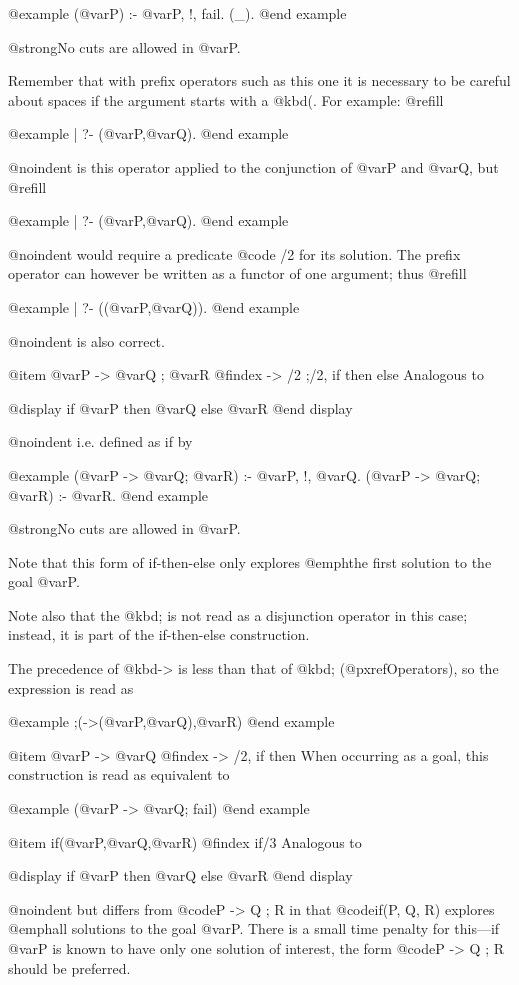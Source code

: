 @example
\+(@var{P}) :- @var{P}, !, fail.
\+(_).
@end example

@strong{No cuts are allowed in @var{P}.}

Remember that with prefix operators such as this one it is necessary to be
careful about spaces if the argument starts with a @kbd{(}.  For
example: @refill

@example
| ?- \+ (@var{P},@var{Q}).
@end example

@noindent
is this operator applied to the conjunction of @var{P} and @var{Q}, but @refill

@example
| ?- \+(@var{P},@var{Q}).
@end example

@noindent
would require a predicate @code{\+ /2} for its solution.  The prefix
operator can however be written as a functor of one argument; thus
@refill

@example
| ?- \+((@var{P},@var{Q})).
@end example

@noindent
is also correct.

@item @var{P} -> @var{Q} ; @var{R}
@findex -> /2 ;/2, if then else
Analogous to

@display
if @var{P} then @var{Q} else @var{R}
@end display

@noindent
i.e. defined as if by 

@example
(@var{P} -> @var{Q}; @var{R}) :- @var{P}, !, @var{Q}.
(@var{P} -> @var{Q}; @var{R}) :- @var{R}.
@end example

@strong{No cuts are allowed in @var{P}.}

Note that this form of if-then-else only explores @emph{the first} solution
to the goal @var{P}.

Note also that the @kbd{;} is not read as a disjunction operator in this case;
instead, it is part of the if-then-else construction.

The precedence of @kbd{->} is less than that of @kbd{;} (@pxref{Operators}),
so the expression is read as

@example
;(->(@var{P},@var{Q}),@var{R})
@end example

@item @var{P} -> @var{Q}
@findex -> /2, if then
When occurring as a goal, this construction is read as equivalent to

@example
(@var{P} -> @var{Q}; fail)
@end example

@item if(@var{P},@var{Q},@var{R})
@findex if/3
Analogous to

@display
if @var{P} then @var{Q} else @var{R}
@end display

@noindent
but differs from @code{P -> Q ; R} in that @code{if(P, Q, R)} explores
@emph{all} solutions to the goal @var{P}.  There is a small time penalty
for this---if @var{P} is known to have only one solution of interest, the
form @code{P -> Q ; R} should be preferred.

